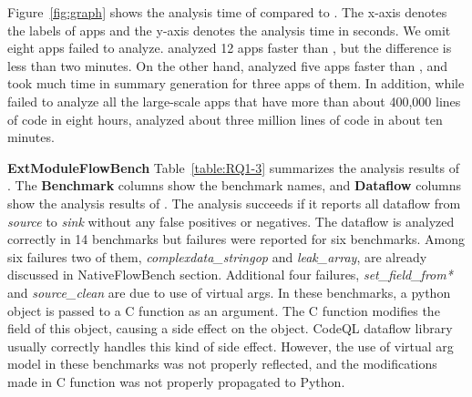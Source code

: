 Figure~\ref{fig:graph} shows the analysis time of \ours compared to \lees.
The x-axis denotes the labels of apps and the y-axis denotes the analysis
time in seconds. We omit eight apps \lees failed to analyze.
\lees analyzed 12 apps faster than \ours, but the difference is
less than two minutes. On the other hand,
\ours analyzed five apps faster than \lees, and \lees took much time
in summary generation for three apps of them. In 
addition, while \lees failed to analyze all the large-scale apps that have
more than about 400,000 lines of code in eight hours,
\ours analyzed about three million lines of
code in about ten minutes.




\textbf{ExtModuleFlowBench}
Table~\ref{table:RQ1-3} summarizes the analysis results of \ours.
The {\bf Benchmark} columns show the benchmark names,
and {\bf Dataflow} columns show the analysis results of \ours.
The analysis succeeds if it reports all dataflow from {\it source} to {\it sink} without any false positives or negatives.
The dataflow is analyzed correctly in 14
benchmarks but failures were reported for six benchmarks.
Among six failures two of them,
{\it complexdata\_stringop} and {\it leak\_array},
are already discussed in NativeFlowBench section.
Additional four failures, {\it set\_field\_from*} and {\it source\_clean}
are due to use of virtual args. In these benchmarks, a python object is
passed to a C function as an argument. The C function modifies the field
of this object, causing a side effect on the object. CodeQL dataflow library
usually correctly handles this kind of side effect. However, the use of virtual arg model
in these benchmarks was not properly reflected, and the modifications made in C function
was not properly propagated to Python.

